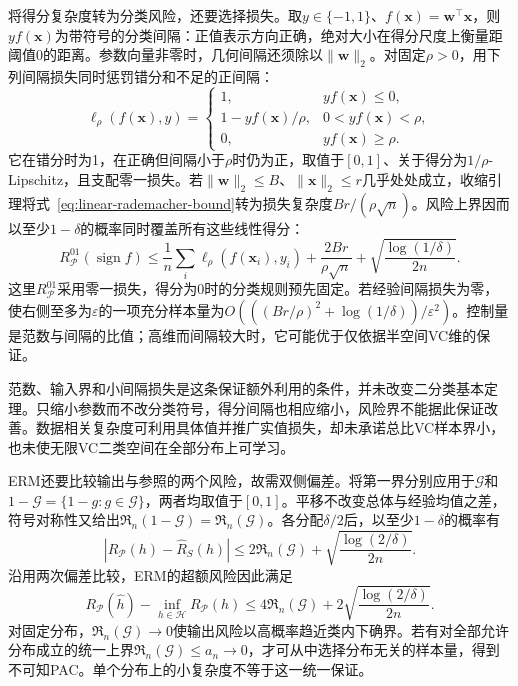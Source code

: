 将得分复杂度转为分类风险，还要选择损失。取$y\in\{-1,1\}$、$f(\bm x)=\bm w^\top\bm x$，则$yf(\bm x)$为带符号的分类间隔：正值表示方向正确，绝对大小在得分尺度上衡量距阈值0的距离。参数向量非零时，几何间隔还须除以$\|\bm w\|_2$。对固定$\rho>0$，用下列间隔损失同时惩罚错分和不足的正间隔：
\[
 \ell_\rho(f(\bm x),y)=
 \begin{cases}
  1,&yf(\bm x)\leq0,\\
  1-yf(\bm x)/\rho,&0<yf(\bm x)<\rho,\\
  0,&yf(\bm x)\geq\rho.
 \end{cases}
\]
它在错分时为1，在正确但间隔小于$\rho$时仍为正，取值于$[0,1]$、关于得分为$1/\rho$-Lipschitz，且支配零一损失。若$\|\bm w\|_2\leq B$、$\|\bm x\|_2\leq r$几乎处处成立，收缩引理将式~\eqref{eq:linear-rademacher-bound}转为损失复杂度$Br/(\rho\sqrt n)$。风险上界因而以至少$1-\delta$的概率同时覆盖所有这些线性得分：
\begin{equation}
 R_{\mathcal P}^{01}(\operatorname{sign}f)
 \leq\frac1n\sum_i\ell_\rho(f(\bm x_i),y_i)
 +\frac{2Br}{\rho\sqrt n}
 +\sqrt{\frac{\log(1/\delta)}{2n}}.
 \label{eq:rademacher-margin-risk}
\end{equation}
这里$R_{\mathcal P}^{01}$采用零一损失，得分为0时的分类规则预先固定。若经验间隔损失为零，使右侧至多为$\varepsilon$的一项充分样本量为$O(((Br/\rho)^2+\log(1/\delta))/\varepsilon^2)$。控制量是范数与间隔的比值；高维而间隔较大时，它可能优于仅依据半空间VC维的保证。

范数、输入界和小间隔损失是这条保证额外利用的条件，并未改变二分类基本定理。只缩小参数而不改分类符号，得分间隔也相应缩小，风险界不能据此保证改善。数据相关复杂度可利用具体值并推广实值损失，却未承诺总比VC样本界小，也未使无限VC二类空间在全部分布上可学习。

ERM还要比较输出与参照的两个风险，故需双侧偏差。将第一界分别应用于$\mathcal G$和$1-\mathcal G=\{1-g:g\in\mathcal G\}$，两者均取值于$[0,1]$。平移不改变总体与经验均值之差，符号对称性又给出$\mathfrak R_n(1-\mathcal G)=\mathfrak R_n(\mathcal G)$。各分配$\delta/2$后，以至少$1-\delta$的概率有
\[
 |R_{\mathcal P}(h)-\hat R_S(h)|
 \leq2\mathfrak R_n(\mathcal G)+\sqrt{\frac{\log(2/\delta)}{2n}}.
\]
沿用两次偏差比较，ERM的超额风险因此满足
\begin{equation}
 R_{\mathcal P}(\hat h)-\inf_{h\in\mathcal H}R_{\mathcal P}(h)
 \leq4\mathfrak R_n(\mathcal G)
 +2\sqrt{\frac{\log(2/\delta)}{2n}}.
 \label{eq:rademacher-excess-risk}
\end{equation}
对固定分布，$\mathfrak R_n(\mathcal G)\to0$使输出风险以高概率趋近类内下确界。若有对全部允许分布成立的统一上界$\mathfrak R_n(\mathcal G)\leq a_n\to0$，才可从中选择分布无关的样本量，得到不可知PAC。单个分布上的小复杂度不等于这一统一保证。

